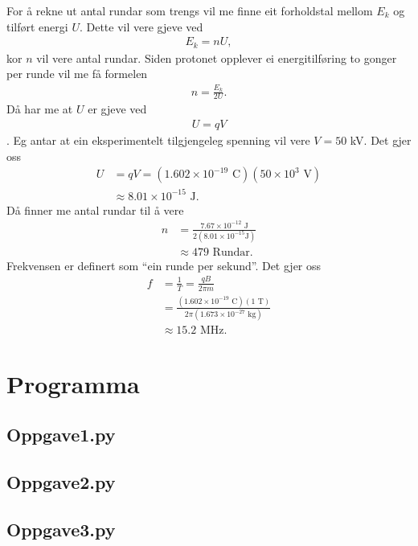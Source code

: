 \documentclass[11pt, a4paper]{article}
\begin{document}
  For å rekne ut antal rundar som trengs vil me finne eit forholdstal mellom $E_k$ og tilført energi $U$. Dette vil vere gjeve ved
  \begin{align*}
    E_k = nU,
  \end{align*}
  kor $n$ vil vere antal rundar. Siden protonet opplever ei energitilføring to gonger per runde vil me få formelen
  \begin{align*}
    n = \frac{E_k}{2U}.
  \end{align*}
  Då har me at $U$ er gjeve ved
  \begin{align*}
    U = qV
  \end{align*}.
  Eg antar at ein eksperimentelt tilgjengeleg spenning vil vere $V = 50$ kV. Det gjer oss
  \begin{align*}
    U &= qV = (1.602\times10^{-19} \text{ C})(50\times10^3\text{ V}) \\
    &\approx 8.01\times10^{-15}\text{ J}.
  \end{align*}
  Då finner me antal rundar til å vere
  \begin{align*}
    n &= \frac{7.67\times10^{-12}\text{ J}}{2(8.01\times10^{-15}\text {J})} \\
    &\approx 479 \text{ Rundar}.
  \end{align*}
  Frekvensen er definert som ``ein runde per sekund''. Det gjer oss
  \begin{align*}
    f &= \frac{1}{T} = \frac{qB}{2\pi m} \\
    &= \frac{(1.602\times10^{-19}\text{ C})(1 \text{ T})}{2\pi (1.673\times10^{-27}\text{ kg})} \\
    &\approx 15.2\text{ MHz}.
  \end{align*}








\newpage

\section{Programma}
  \subsection{Oppgave1.py}
    
  \subsection{Oppgave2.py}
    
  \subsection{Oppgave3.py}
    
\end{document}
